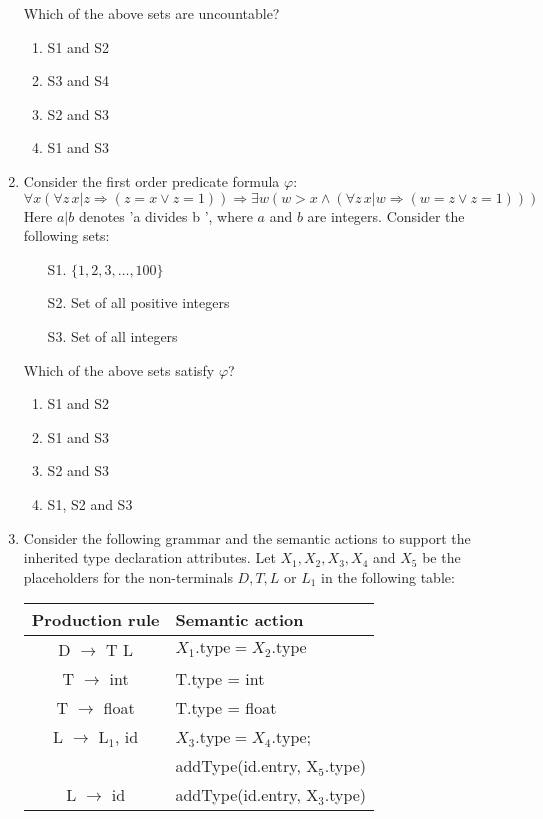 \documentclass[12pt]{article}
\begin{document}
\begin{enumerate}[label=Q.\arabic*]
Which of the above sets are uncountable?
\begin{enumerate}[label=(\Alph*)]
\item S1 and S2
\item S3 and S4
\item S2 and S3
\item S1 and S3
\end{enumerate}

\item Consider the first order predicate formula $\varphi$: \\
$\forall x\left(\forall z\, x|z \Rightarrow (z = x \vee z = 1)\right) \Rightarrow \exists w \left( w > x \wedge (\forall z\, x|w \Rightarrow (w = z \vee z = 1))\right)$\\
Here $a|b$ denotes 'a divides b ', where $a$ and $b$ are integers. Consider the following sets:
\begin{itemize}
\item[S1.] $\{1,2,3,\ldots,100\}$
\item[S2.] Set of all positive integers
\item[S3.] Set of all integers
\end{itemize}

Which of the above sets satisfy $\varphi$?
\begin{enumerate}[label=(\Alph*)]
\item S1 and S2
\item S1 and S3
\item S2 and S3
\item S1, S2 and S3
\end{enumerate}

\item Consider the following grammar and the semantic actions to support the inherited type declaration attributes. Let $X_1, X_2, X_3, X_4$ and $X_5$ be the placeholders for the non-terminals $D, T, L$ or $L_1$ in the following table:

\begin{center}
\begin{tabular}{|c|l|}
\hline
Production rule & Semantic action \\
\hline
D $\rightarrow$ T L & $X_1.\text{type} = X_2.\text{type}$ \\
T $\rightarrow$ int & T.type = int \\
T $\rightarrow$ float & T.type = float \\
L $\rightarrow$ L$_1$, id & $X_3.\text{type} = X_4.\text{type}$; \\
                        & addType(id.entry, X$_5$.type) \\
L $\rightarrow$ id & addType(id.entry, X$_3$.type) \\
\hline
\end{tabular}
\end{center}


\end{enumerate}
\end{document}
